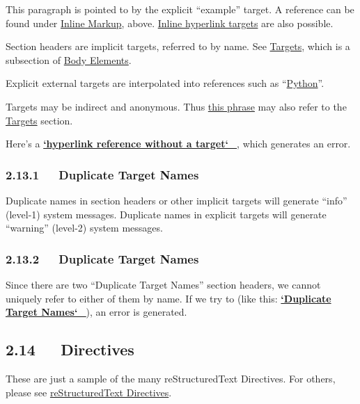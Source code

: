 \documentclass[a4paper]{article}
\begin{document}
\label{example}
This paragraph is pointed to by the explicit “example” target. A
reference can be found under \hyperref[inline-markup]{Inline Markup}, above. \hyperref[inline-hyperlink-targets]{Inline
hyperlink targets} are also possible.

Section headers are implicit targets, referred to by name. See
\hyperref[targets]{Targets}, which is a subsection of \hyperref[body-elements]{Body Elements}.

Explicit external targets are interpolated into references such as
“\href{http://www.python.org/}{Python}”.

Targets may be indirect and anonymous.  Thus \hyperref[targets]{this phrase} may also
refer to the \hyperref[targets]{Targets} section.

Here’s a %
\hyperlink{system-message-4}{\textbf{\color{red}`hyperlink reference without a target`\_}}, which generates an
error.


\subsubsection{2.13.1   Duplicate Target Names%
  \label{duplicate-target-names}%
}

Duplicate names in section headers or other implicit targets will
generate “info” (level-1) system messages.  Duplicate names in
explicit targets will generate “warning” (level-2) system messages.


\subsubsection{2.13.2   Duplicate Target Names%
  \label{duplicate-target-names-1}%
}

Since there are two “Duplicate Target Names” section headers, we
cannot uniquely refer to either of them by name.  If we try to (like
this: %
\hyperlink{system-message-5}{\textbf{\color{red}`Duplicate Target Names`\_}}), an error is generated.


\subsection{2.14   Directives%
  \label{directives}%
}

\label{contents}
These are just a sample of the many reStructuredText Directives.  For
others, please see \href{https://docutils.sourceforge.io/docs/ref/rst/directives.html}{reStructuredText Directives}.
\end{document}

